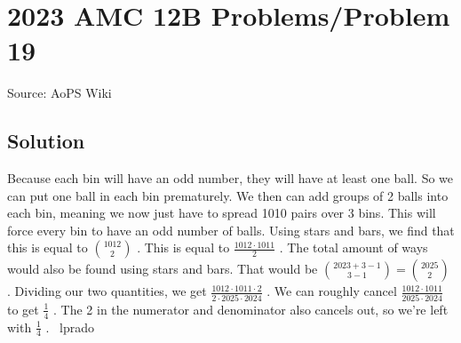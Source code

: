 \documentclass[12pt]{article}
\begin{document}
\section*{{2023 AMC 12B Problems/Problem 19}}
Source: AoPS Wiki

\subsection*{Solution}
Because each bin will have an odd number, they will have at least one ball. So we can put one ball in each bin prematurely. We then can add groups of 2 balls into each bin, meaning we now just have to spread 1010 pairs over 3 bins. This will force every bin to have an odd number of balls. Using stars and bars, we find that this is equal to $\binom{1012}{2}$ . This is equal to $\frac{1012\cdot1011}{2}$ . The total amount of ways would also be found using stars and bars. That would be $\binom{2023+3-1}{3-1} = \binom{2025}{2}$ . Dividing our two quantities, we get $\frac{1012 \cdot 1011 \cdot 2}{2 \cdot 2025 \cdot 2024}$ . We can roughly cancel $\frac{1012 \cdot 1011}{2025 \cdot 2024}$ to get $\frac{1}{4}$ . The 2 in the numerator and denominator also cancels out, so we're left with $\boxed{\frac{1}{4}}$ . ~lprado
\end{document}
